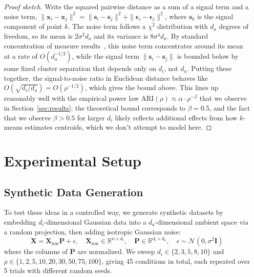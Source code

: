 \documentclass[pdflatex,sn-mathphys-num]{sn-jnl}
\theoremstyle{thmstyleone}
\begin{document}
\begin{proof}[Proof sketch]
Write the squared pairwise distance as a sum of a signal term and a noise term,
$\|\mathbf{x}_i - \mathbf{x}_j\|^2 = \|\mathbf{s}_i - \mathbf{s}_j\|^2 + \|\boldsymbol{\epsilon}_i - \boldsymbol{\epsilon}_j\|^2$,
where $\mathbf{s}_k$ is the signal component of point $k$. The noise term
follows a $\chi^2$ distribution with $d_a$ degrees of freedom, so its mean is
$2\sigma^2 d_a$ and its variance is $8\sigma^4 d_a$. By standard concentration
of measure results~\cite{vershynin2018}, this noise term concentrates around
its mean at a rate of $O(d_a^{-1/2})$, while the signal term
$\|\mathbf{s}_i - \mathbf{s}_j\|$ is bounded below by some fixed cluster
separation that depends only on $d_i$, not $d_a$. Putting these together, the
signal-to-noise ratio in Euclidean distance behaves like
$O(\sqrt{d_i/d_a}) = O(\rho^{-1/2})$, which gives the bound above. This lines
up reasonably well with the empirical power law
$\mathrm{ARI}(\rho) \approx \alpha \cdot \rho^{-\beta}$ that we observe in
Section~\ref{sec:results}: the theoretical bound corresponds to $\beta=0.5$,
and the fact that we observe $\beta > 0.5$ for larger $d_i$ likely reflects
additional effects from how $k$-means estimates centroids, which we don't
attempt to model here.
\end{proof}

\section{Experimental Setup}

\subsection{Synthetic Data Generation}
To test these ideas in a controlled way, we generate synthetic datasets by
embedding $d_i$-dimensional Gaussian data into a $d_a$-dimensional ambient
space via a random projection, then adding isotropic Gaussian noise:
\begin{equation}
    \mathbf{X} = \mathbf{X}_{\text{low}} \mathbf{P} + \epsilon, \quad
    \mathbf{X}_{\text{low}} \in \mathbb{R}^{n \times d_i}, \quad
    \mathbf{P} \in \mathbb{R}^{d_i \times d_a}, \quad
    \epsilon \sim \mathcal{N}(0, \sigma^2 \mathbf{I})
\end{equation}
where the columns of $\mathbf{P}$ are normalized. We sweep
$d_i \in \{2,3,5,8,10\}$ and
$\rho \in \{1,2,5,10,20,30,50,75,100\}$, giving 45 conditions in total, each
repeated over 5 trials with different random seeds.
\end{document}
